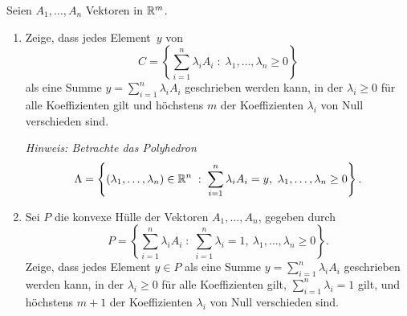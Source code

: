 \documentclass{uebung_cs}
\begin{document}
\begin{exercise}
%
	Seien $A_1,\dots , A_n$ Vektoren in $\mathbb{R}^m$.
	\begin{enumerate}
		\item Zeige, dass jedes Element~$y$ von 
			\[
				C=\left\{\sum_{i=1}^n \lambda_i A_i \;:\; \lambda_1, \dots , \lambda_n\geq 0\right\}
			\]
			als eine Summe $y=\sum_{i=1}^n \lambda_i A_i$ geschrieben werden kann, in der $\lambda_i\geq 0$ für alle Koeffizienten gilt und höchstens $m$ der Koeffizienten $\lambda_i$ von Null verschieden sind. 

			\textit{Hinweis: Betrachte das Polyhedron
			\[
				\Lambda=\left\{(\lambda_1, \dots , \lambda_n)\in \mathbb{R}^n \;:\; \sum_{i=1}^n\lambda_i A_i = y,\ \lambda_1, \dots , \lambda_n\geq 0\right\}.
			\]}
		\item Sei $P$ die konvexe Hülle der Vektoren $A_1,\dots,A_n$, gegeben durch
			\[
				P=\left\{\sum_{i=1}^n \lambda_i A_i \;:\; \sum_{i=1}^n\lambda_i=1,\ \lambda_1, \dots , \lambda_n\geq 0\right\}.
			\]
			Zeige, dass jedes Element $y\in P$ als eine Summe $y=\sum_{i=1}^n \lambda_i A_i$ geschrieben werden kann, in der $\lambda_i\geq 0$ für alle Koeffizienten gilt, $\sum_{i=1}^n\lambda_i=1$ gilt, und höchstens $m+1$ der Koeffizienten $\lambda_i$ von Null verschieden sind. 
	\end{enumerate}
\end{exercise}
\end{document}
